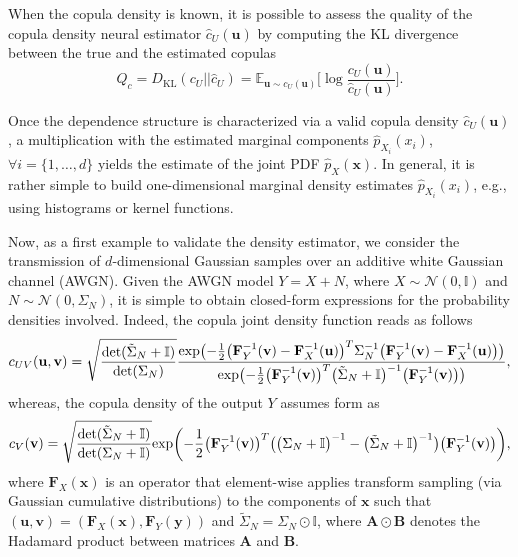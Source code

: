 When the copula density is known, it is possible to assess the quality of the copula density neural estimator $\hat{c}_{U}(\mathbf{u})$ by computing the KL divergence between the true and the estimated copulas
\begin{equation}
Q_c = D_{\text{KL}}(c_{U}||\hat{c}_{U}) = \mathbb{E}_{\mathbf{u}\sim c_{U}(\mathbf{u})}\biggl[\log\frac{c_{U}(\mathbf{u})}{\hat{c}_{U}(\mathbf{u})}\biggr].
\end{equation}

Once the dependence structure is characterized via a valid copula density $\hat{c}_{U}(\mathbf{u})$, a multiplication with the estimated marginal components $\hat{p}_{X_i}(x_i)$, $\forall i=\{1,\dots,d\}$ yields the estimate of the joint PDF $\hat{p}_{X}(\mathbf{x})$. In general, it is rather simple to build one-dimensional marginal density estimates $\hat{p}_{X_i}(x_i)$, e.g., using histograms or kernel functions. 

Now, as a first example to validate the density estimator, we consider the transmission of $d$-dimensional Gaussian samples over an additive white Gaussian channel (AWGN). Given the  AWGN model $Y=X+N$, where $X \sim \mathcal{N}(0,\mathbb{I})$ and $N \sim \mathcal{N}(0,\Sigma_N)$, it is simple to obtain closed-form expressions for the probability densities involved. 
Indeed, the copula joint density function reads as follows
\begin{equation}
\small
c_{UV}(\mathbf{u},\mathbf{v}) = \sqrt{\frac{\det(\tilde{\Sigma}_N+\mathbb{I})}{\det(\Sigma_N)}}\frac{\exp\bigl(-\frac{1}{2}\bigl(\mathbf{F}_Y^{-1}(\mathbf{v})-\mathbf{F}_X^{-1}(\mathbf{u})\bigr)^T\Sigma_N^{-1}\bigl(\mathbf{F}_Y^{-1}(\mathbf{v})-\mathbf{F}_X^{-1}(\mathbf{u})\bigr)\bigr)}{\exp\bigl(-\frac{1}{2}\bigl(\mathbf{F}_Y^{-1}(\mathbf{v})\bigr)^T\bigl(\tilde{\Sigma}_N+\mathbb{I}\bigr)^{-1}\bigl(\mathbf{F}_Y^{-1}(\mathbf{v})\bigr)\bigr)},
\end{equation}
whereas, the copula density of the output $Y$ assumes form as
\begin{equation}
\small
\label{eq:codine_copula_gaussian_y}
c_{V}(\mathbf{v}) = \sqrt{\frac{\det(\tilde{\Sigma}_N+\mathbb{I})}{\det(\Sigma_N+\mathbb{I})}}{\exp\biggl(-\frac{1}{2}\bigl(\mathbf{F}_Y^{-1}(\mathbf{v})\bigr)^T\bigl(\bigl(\Sigma_N+\mathbb{I}\bigr)^{-1}-\bigl(\tilde{\Sigma}_N+\mathbb{I}\bigr)^{-1}\bigr)\bigl(\mathbf{F}_Y^{-1}(\mathbf{v})\bigr)\biggr)},
\end{equation}
 where $\mathbf{F}_X(\mathbf{x})$ is an operator that element-wise applies transform sampling (via Gaussian cumulative distributions) to the components of $\mathbf{x}$ such that $(\mathbf{u},\mathbf{v}) = (\mathbf{F}_X(\mathbf{x}),\mathbf{F}_Y(\mathbf{y}))$ and $\tilde{\Sigma}_N = \Sigma_N \odot \mathbb{I}$, where $\mathbf{A} \odot \mathbf{B}$ denotes the Hadamard product between matrices $\mathbf{A}$ and $\mathbf{B}$. 

